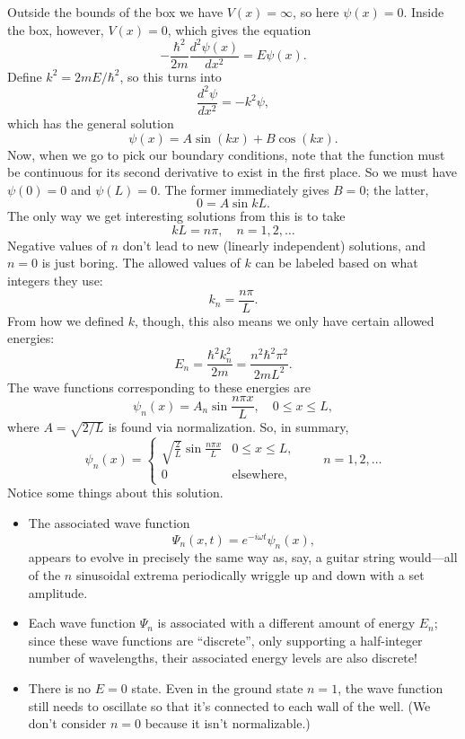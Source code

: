 \documentclass[../p052main.tex]{subfiles}
\begin{document}
Outside the bounds of the box we have $V(x) = \infty$, so here $\psi(x) = 0$.
Inside the box, however, $V(x) = 0$, which gives the equation
\[ -\frac{\hbar^2}{2m} \frac{d^2 \psi(x)}{dx^2} = E \psi (x). \]
Define $k^2 = 2mE / \hbar^2$, so this turns into
\[ \frac{d^2 \psi}{dx^2} = -k^2 \psi, \]
which has the general solution
\[ \psi(x) = A \sin (kx) + B \cos (kx). \]
Now, when we go to pick our boundary conditions, note that the function must be continuous for its second derivative to exist in the first place.
So we must have $\psi(0) = 0$ and $\psi(L) = 0$.
The former immediately gives $B = 0$; the latter,
\[ 0 = A \sin kL. \]
The only way we get interesting solutions from this is to take
\[ kL = n \pi, \quad n = 1, 2, \ldots \]
Negative values of $n$ don't lead to new (linearly independent) solutions, and $n = 0$ is just boring.
The allowed values of $k$ can be labeled based on what integers they use:
\[ k_n = \frac{n \pi}{L}. \]
From how we defined $k$, though, this also means we only have certain allowed energies:
\[ E_n = \frac{\hbar^2 k_n^2}{2m} = \frac{n^2 \hbar^2 \pi^2}{2mL^2}. \]
The wave functions corresponding to these energies are
\[ \psi_n(x) = A_n \sin \frac{n \pi x}{L}, \quad 0 \leq x \leq L, \]
where $A = \sqrt{2/L}$ is found via normalization.
So, in summary,
\[ \psi_n(x) = \begin{cases} \sqrt{\frac{2}{L}} \sin \frac{n \pi x}{L} & 0 \leq x \leq L, \\ 0 & \text{elsewhere}, \end{cases} \qquad n = 1, 2, \ldots \]
Notice some things about this solution.
\begin{itemize}
    \item The associated wave function
    \[ \Psi_n(x,t) = e^{-i \omega t} \psi_n(x), \]
    appears to evolve in precisely the same way as, say, a guitar string would---all of the $n$ sinusoidal extrema periodically wriggle up and down with a set amplitude.
    \item Each wave function $\Psi_n$ is associated with a different amount of energy $E_n$; since these wave functions are ``discrete'', only supporting a half-integer number of wavelengths, their associated energy levels are also discrete!
    \item There is no $E = 0$ state.
    Even in the ground state $n=1$, the wave function still needs to oscillate so that it's connected to each wall of the well.
    (We don't consider $n=0$ because it isn't normalizable.)
\end{itemize}
\end{document}
